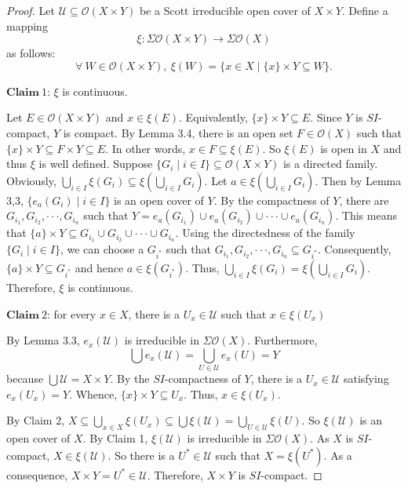 \documentclass[10pt,a4paper]{amsart}
\begin{document}
\begin{proof} Let $\mathcal{U}\subseteq\mathcal{O}(X\times Y)$ be a Scott irreducible open cover of $X\times Y$. Define a mapping $$\xi:\Sigma\mathcal{O}(X\times Y)\longrightarrow\Sigma\mathcal{O}(X)$$ as follows:
$$\forall\ W\in\mathcal{O}(X\times Y),\ \xi(W)=\{x\in X\mid \{x\}\times Y\subseteq W\}.$$

$\mathbf{Claim} \ 1$: $\xi$ is continuous.

Let $E\in\mathcal{O}(X\times Y)$ and $x\in \xi(E)$. Equivalently, $\{x\}\times Y\subseteq E$. Since $Y$ is $SI$-compact, $Y$ is compact. By Lemma 3.4, there is an open set $F\in\mathcal{O}(X)$ such that $\{x\}\times Y\subseteq F\times Y\subseteq E$. In other words, $x\in F\subseteq\xi(E)$. So $\xi(E)$ is open in $X$ and thus $\xi$ is well defined. Suppose $\{G_{i}\mid i\in I\}\subseteq\mathcal{O}(X\times Y)$ is a directed family. Obviously, $\bigcup\limits_{i\in I}\xi(G_{i})\subseteq \xi(\bigcup\limits_{i\in I}G_{i})$. Let $a\in\xi(\bigcup\limits_{i\in I}G_{i})$. Then by Lemma 3,3, $\{e_{a}(G_{i})\mid i\in I\}$ is an open cover of $Y$. By the compactness of $Y$, there are $G_{i_{1}},G_{i_{2}},\cdot\cdot\cdot,G_{i_{n}}$ such that $Y=e_{a}(G_{i_{1}})\cup e_{a}(G_{i_{2}})\cup\cdot\cdot\cdot\cup e_{a}(G_{i_{n}})$. This means that $\{a\}\times Y\subseteq G_{i_{1}}\cup G_{i_{2}}\cup\cdot\cdot\cdot\cup G_{i_{n}}$. Using the directedness of the family $\{G_{i}\mid i\in I\}$, we can choose a $G_{i^{\ast}}$ such that $G_{i_{1}},G_{i_{2}},\cdot\cdot\cdot,G_{i_{n}}\subseteq G_{i^{\ast}}$. Consequently, $\{a\}\times Y\subseteq G_{i^{\ast}}$ and hence $a\in\xi(G_{i^{\ast}})$. Thus, $\bigcup\limits_{i\in I}\xi(G_{i})=\xi(\bigcup\limits_{i\in I}G_{i})$. Therefore, $\xi$ is continuous.


$\mathbf{Claim}\ 2$: for every $x\in X$, there is a $U_{x}\in\mathcal{U}$ such that $x\in \xi(U_{x})$

By Lemma 3.3, $e_{x}(\mathcal{U})$ is irreducible in $\Sigma\mathcal{O}(X)$. Furthermore, $$\bigcup e_{x}(\mathcal{U})=\bigcup\limits_{U\in\mathcal{U}}e_{x}(U)=Y$$ because $\bigcup\mathcal{U}=X\times Y$. By the $SI$-compactness of $Y$, there is a $U_{x}\in\mathcal{U}$ satisfying $e_{x}(U_{x})=Y$. Whence, $\{x\}\times Y\subseteq U_{x}$. Thus, $x\in\xi(U_{x})$.

By Claim 2, $X\subseteq\bigcup\limits_{x\in X}\xi(U_{x})\subseteq\bigcup\xi(\mathcal{U})=\bigcup\limits_{U\in\mathcal{U}}\xi(U)$. So $\xi(\mathcal{U})$ is an open cover of $X$. By Claim 1, $\xi(\mathcal{U})$ is irreducible in $\Sigma\mathcal{O}(X)$. As $X$ is $SI$-compact, $X\in\xi(\mathcal{U})$. So there is a $U^{\ast}\in\mathcal{U}$ such that $X=\xi(U^{\ast})$. As a consequence, $X\times Y=U^{\ast}\in\mathcal{U}$. Therefore, $X\times Y$ is $SI$-compact.
\end{proof}
\end{document}
